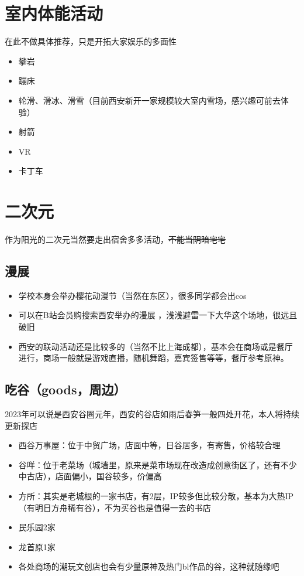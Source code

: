 \documentclass[zihao=-4,fontset=none]{Beautybook-CN}
\begin{document}
\section{室内体能活动}
在此不做具体推荐，只是开拓大家娱乐的多面性
\begin{itemize}
\item 攀岩
\item 蹦床
\item 轮滑、滑冰、滑雪（目前西安新开一家规模较大室内雪场，感兴趣可前去体验）
\item 射箭
\item VR
\item 卡丁车
\end{itemize}
\section{二次元}

作为阳光的二次元当然要走出宿舍多多活动，\sout{不能当阴暗宅宅}

\subsection{漫展}
\begin{itemize}
\item 学校本身会举办樱花动漫节（当然在东区），很多同学都会出cos
\item 可以在B站会员购搜索西安举办的漫展 ，浅浅避雷一下大华这个场地，很远且破旧
\item 西安的联动活动还是比较多的（当然不比上海成都），基本会在商场或是餐厅进行，商场一般就是游戏直播，随机舞蹈，嘉宾签售等等，餐厅参考原神。
\end{itemize}
\subsection{吃谷（goods，周边）}

2023年可以说是西安谷圈元年，西安的谷店如雨后春笋一般四处开花，本人将持续更新探店
\begin{itemize}
\item 西谷万事屋：位于中贸广场，店面中等，日谷居多，有寄售，价格较合理
\item 谷咩：位于老菜场（城墙里，原来是菜市场现在改造成创意街区了，还有不少中古店），店面偏小，国谷较多，价偏高
\item 方所：其实是老城根的一家书店，有2层，IP较多但比较分散，基本为大热IP（有明日方舟稀有谷），不为买谷也是值得一去的书店
\item 民乐园2家
\item 龙首原1家
\item 各处商场的潮玩文创店也会有少量原神及热门bl作品的谷，这种就随缘吧
\end{itemize}
\end{document}

